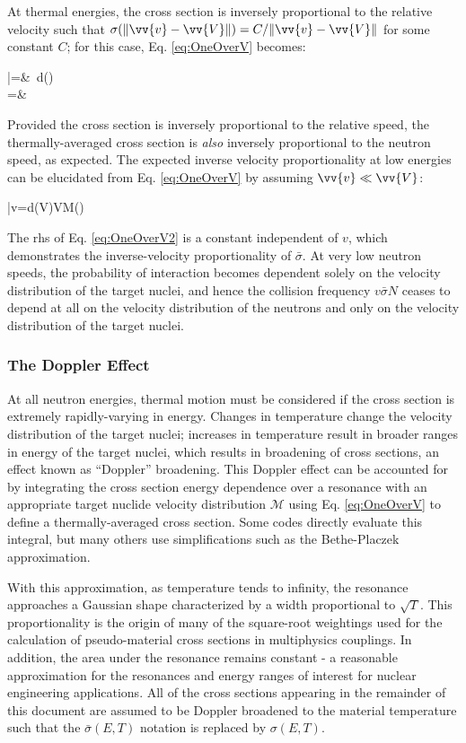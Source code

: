 At thermal energies, the cross section is inversely proportional to the relative velocity such that \(\sigma(\|\vv{v}-\vv{V}\|)=C/\|\vv{v}-\vv{V}\|\) for some constant \(C\); for this case, Eq. \eqref{eq:OneOverV} becomes:

\beqa
\label{eq:ThermalNeutronProp}
\bar{\sigma}=&\ \int d()\\
=&\ 
\eeqa

Provided the cross section is inversely proportional to the relative speed, the thermally-averaged cross section is {\it also} inversely proportional to the neutron speed, as expected. The expected inverse velocity proportionality at low energies can be elucidated from Eq. \eqref{eq:OneOverV} by assuming \(\vv{v}\ll\vv{V}\):

\beq
\label{eq:OneOverV2}
\bar{\sigma}v=\int d\sigma(V)VM()
\eeq

The \gls{rhs} of Eq. \eqref{eq:OneOverV2} is a constant independent of \(v\), which demonstrates the inverse-velocity proportionality of \(\bar{\sigma}\). At very low neutron speeds, the probability of interaction becomes dependent solely on the velocity distribution of the target nuclei, and hence the collision frequency \(v\bar{\sigma}N\) ceases to depend at all on the velocity distribution of the neutrons and only on the velocity distribution of the target nuclei. 

\subsubsection{The Doppler Effect}

At all neutron energies, thermal motion must be considered if the cross section is extremely rapidly-varying in energy. Changes in temperature change the velocity distribution of the target nuclei; increases in temperature result in broader ranges in energy of the target nuclei, which results in broadening of cross sections, an effect known as ``Doppler'' broadening. This Doppler effect can be accounted for by integrating the cross section energy dependence over a resonance with an appropriate target nuclide velocity distribution \(\mathscr{M}\) using Eq. \eqref{eq:OneOverV} to define a thermally-averaged cross section. Some codes directly evaluate this integral, but many others use simplifications such as the Bethe-Placzek approximation. 

With this approximation, as temperature tends to infinity, the resonance approaches a Gaussian shape characterized by a width proportional to \(\sqrt{T}\). This proportionality is the origin of many of the square-root weightings used for the calculation of pseudo-material cross sections in multiphysics couplings. In addition, the area under the resonance remains constant - a reasonable approximation for the resonances and energy ranges of interest for nuclear engineering applications. All of the cross sections appearing in the remainder of this document are assumed to be Doppler broadened to the material temperature such that the \(\bar{\sigma}(E,T)\) notation is replaced by \(\sigma(E,T)\). 

